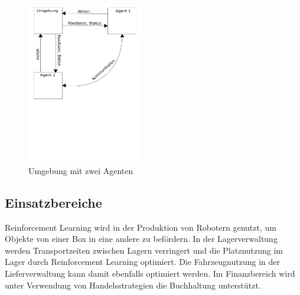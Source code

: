 	\begin{figure}[H]
		\centering
		\includegraphics[width=5cm]{Bilder/multiagent.pdf}
		\caption{Umgebung mit zwei Agenten}
		\label{fig:abb8}
	\end{figure}

	\subsection{Einsatzbereiche}	
	Reinforcement Learning wird in der Produktion von Robotern genutzt, um Objekte von einer Box in eine andere zu befördern. In der Lagerverwaltung werden Transportzeiten zwischen Lagern verringert und die Platznutzung im Lager durch Reinforcement Learning optimiert. Die Fahrzeugnutzung in der Lieferverwaltung kann damit ebenfalls optimiert werden. Im Finanzbereich wird unter Verwendung von Handelsstrategien die Buchhaltung unterstützt. \cite{Nandy2018}
	